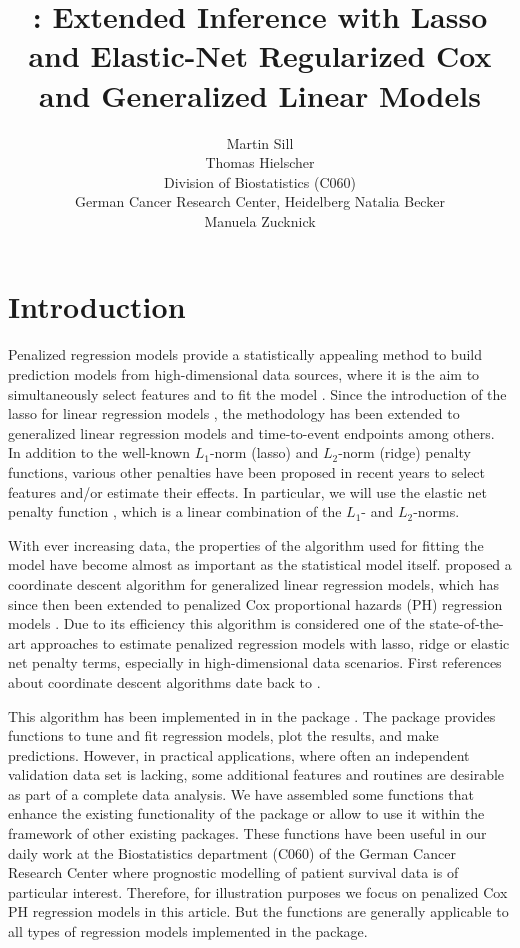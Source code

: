 \documentclass[]{jss}
\author{Martin Sill\\
\And Thomas Hielscher\\ \hspace{3.95 cm} Division of Biostatistics (C060) \\  \hspace{4.3 cm} German Cancer Research Center, Heidelberg
\And Natalia Becker\\
\And Manuela Zucknick\\}
\title{\pkg{c060}: Extended Inference with Lasso and Elastic-Net Regularized Cox and Generalized Linear Models}
\begin{document}


\section{Introduction}
\label{intro}

Penalized regression models provide a statistically appealing method to build prediction models from high-dimensional data sources, where it is the aim to simultaneously select features and to fit the model \citep{fan2010,benner2010}. Since the introduction of the lasso for linear regression models \citep{tibshirani96}, the methodology has been extended to generalized linear regression models and time-to-event endpoints \citep{tibshirani97} among others. In addition to the well-known $L_1$-norm (lasso) and $L_2$-norm (ridge) penalty functions, various other penalties have been proposed in recent years to select features and/or estimate their effects. In particular, we will use the elastic net penalty function \citep{zou05}, which is a linear combination of the $L_1$- and $L_2$-norms.

With ever increasing data, the properties of the algorithm used for fitting the model have become almost as important as the statistical model itself. 
\citet{FHT2010} proposed a coordinate descent algorithm for generalized linear regression models, which has since then been extended to penalized Cox proportional hazards (PH) regression models \citep{simon2011}. Due to its efficiency this algorithm is considered one of the state-of-the-art
approaches to estimate penalized regression models with lasso, ridge or elastic net penalty terms, especially in high-dimensional data scenarios. 
First references about coordinate descent algorithms date back to \citet{Fu98}. %

This algorithm has been implemented in  \citep{R11} in the  package \citep{glmnet}. The package provides functions to tune and fit regression models, plot the results, and make predictions. However, in practical applications, where often an independent validation data set is lacking, some additional features and routines are desirable as part of a complete data analysis. We have assembled some functions that enhance the existing functionality of the  package or
allow to use it within the framework of other existing  packages. These functions have been useful in our daily work at the
Biostatistics department (C060) of the German Cancer Research Center where prognostic modelling of patient survival data is of particular interest. Therefore, for illustration purposes we focus on penalized Cox PH regression models in this article. But the  functions are generally applicable to all types of regression models implemented in the  package.
\end{document}
